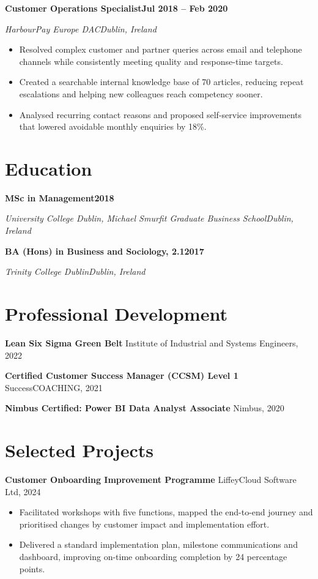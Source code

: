 \documentclass[10pt,a4paper]{article}
\newcommand{\cvheading}[4]{%
  \needspace{4\baselineskip}%
  \textbf{#1}\hfill\textbf{#2}\par
  \textit{#3}\hfill\textit{#4}\par
}
\newcommand{\educationentry}[4]{%
  \needspace{3\baselineskip}%
  \textbf{#1}\hfill\textbf{#2}\par
  \textit{#3}\hfill\textit{#4}\par
}
\begin{document}
\cvheading{Customer Operations Specialist}{Jul 2018 -- Feb 2020}{HarbourPay Europe DAC}{Dublin, Ireland}
\begin{itemize}
  \item Resolved complex customer and partner queries across email and telephone channels while consistently meeting quality and response-time targets.
  \item Created a searchable internal knowledge base of 70 articles, reducing repeat escalations and helping new colleagues reach competency sooner.
  \item Analysed recurring contact reasons and proposed self-service improvements that lowered avoidable monthly enquiries by 18\%.
\end{itemize}

\section{Education}

\educationentry{MSc in Management}{2018}{University College Dublin, Michael Smurfit Graduate Business School}{Dublin, Ireland}
\vspace{5pt}
\educationentry{BA (Hons) in Business and Sociology, 2.1}{2017}{Trinity College Dublin}{Dublin, Ireland}

\section{Professional Development}

\textbf{Lean Six Sigma Green Belt} \hfill Institute of Industrial and Systems Engineers, 2022\par
\vspace{4pt}
\textbf{Certified Customer Success Manager (CCSM) Level 1} \hfill SuccessCOACHING, 2021\par
\vspace{4pt}
\textbf{Nimbus Certified: Power BI Data Analyst Associate} \hfill Nimbus, 2020

\section{Selected Projects}

\textbf{Customer Onboarding Improvement Programme} \hfill LiffeyCloud Software Ltd, 2024
\begin{itemize}
  \item Facilitated workshops with five functions, mapped the end-to-end journey and prioritised changes by customer impact and implementation effort.
  \item Delivered a standard implementation plan, milestone communications and dashboard, improving on-time onboarding completion by 24 percentage points.
\end{itemize}
\end{document}
